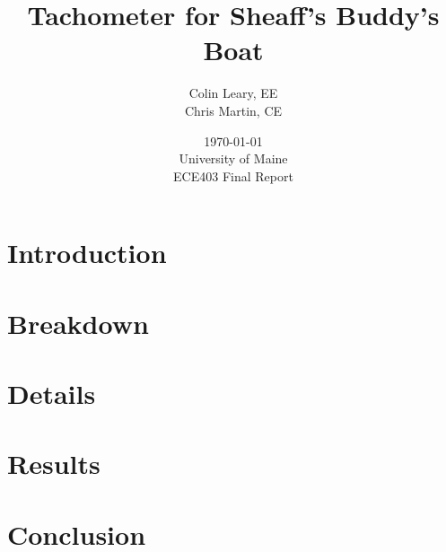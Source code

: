\documentclass[11pt]{article}
\begin{document}
\title{ \textbf{Tachometer for Sheaff's Buddy's Boat}}
\author{Colin Leary, EE \\ Chris Martin, CE}
\date{\today\\[2ex]%
University of Maine\\%
ECE403 Final Report}
\maketitle
\newpage
\clearpage

\begin{abstract}


\end{abstract}
\newpage
\clearpage

\begin{singlespacing}
    \tableofcontents
    \newpage
    \clearpage
    
    \listoffigures
    \newpage
    \clearpage
    
\end{singlespacing}

\section{Introduction}
\label{sec:intro}



\section{Breakdown}
\label{sec:break}


\section{Details}
\label{sec:det}


\section{Results}
\label{sec:res}


\section{Conclusion}
\label{sec:con}


\newpage


\newpage
\end{document}
